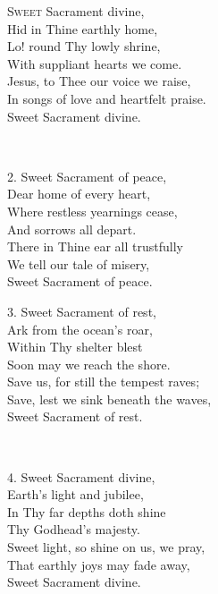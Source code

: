 


\begin{minipage}[t]{0.5\textwidth}
\lettrine{S}{weet} Sacrament divine,\\ %
Hid in Thine earthly home,\\
Lo! round Thy lowly shrine,\\
\phantom{tab} With suppliant hearts we come.\\
Jesus, to Thee our voice we raise,\\
In songs of love and heartfelt praise.\\
\phantom{tab} Sweet Sacrament divine.

~

\hskip-3pt 2. Sweet Sacrament of peace,\\
\phantom{tab} Dear home of every heart,\\
Where restless yearnings cease,\\
\phantom{tab} And sorrows all depart.\\
There in Thine ear all trustfully\\
We tell our tale of misery,\\
\phantom{tab} Sweet Sacrament of peace.
\end{minipage}
\hskip5mm
\begin{minipage}[t]{0.5\textwidth}
\hskip-3pt 3. Sweet Sacrament of rest,\\
\phantom{tab} Ark from the ocean's roar,\\
Within Thy shelter blest\\
\phantom{tab} Soon may we reach the shore.\\
Save us, for still the tempest raves;\\
Save, lest we sink beneath the waves,\\
\phantom{tab} Sweet Sacrament of rest.

~

\hskip-3pt 4. Sweet Sacrament divine,\\
\phantom{tab} Earth's light and jubilee,\\
In Thy far depths doth shine\\
\phantom{tab} Thy Godhead's majesty.\\
Sweet light, so shine on us, we pray,\\
That earthly joys may fade away,\\
\phantom{tab} Sweet Sacrament divine.
\end{minipage}

\medskip




